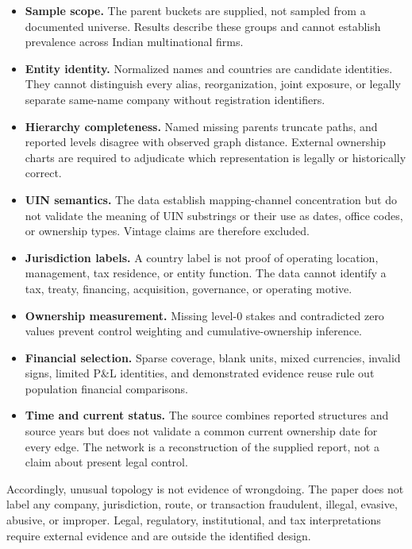 \documentclass[11pt]{article}
\begin{document}
\begin{itemize}
  \item \textbf{Sample scope.} The parent buckets are supplied, not sampled
  from a documented universe. Results describe these groups and cannot
  establish prevalence across Indian multinational firms.
  \item \textbf{Entity identity.} Normalized names and countries are candidate
  identities. They cannot distinguish every alias, reorganization, joint
  exposure, or legally separate same-name company without registration
  identifiers.
  \item \textbf{Hierarchy completeness.} Named missing parents truncate paths,
  and reported levels disagree with observed graph distance. External
  ownership charts are required to adjudicate which representation is legally
  or historically correct.
  \item \textbf{UIN semantics.} The data establish mapping-channel
  concentration but do not validate the meaning of UIN substrings or their
  use as dates, office codes, or ownership types. Vintage claims are therefore
  excluded.
  \item \textbf{Jurisdiction labels.} A country label is not proof of operating
  location, management, tax residence, or entity function. The data cannot
  identify a tax, treaty, financing, acquisition, governance, or operating
  motive.
  \item \textbf{Ownership measurement.} Missing level-0 stakes and contradicted
  zero values prevent control weighting and cumulative-ownership inference.
  \item \textbf{Financial selection.} Sparse coverage, blank units, mixed
  currencies, invalid signs, limited P\&L identities, and demonstrated evidence
  reuse rule out population financial comparisons.
  \item \textbf{Time and current status.} The source combines reported
  structures and source years but does not validate a common current ownership
  date for every edge. The network is a reconstruction of the supplied report,
  not a claim about present legal control.
\end{itemize}

Accordingly, unusual topology is not evidence of wrongdoing. The paper does
not label any company, jurisdiction, route, or transaction fraudulent,
illegal, evasive, abusive, or improper. Legal, regulatory, institutional, and
tax interpretations require external evidence and are outside the identified
design.
\end{document}
